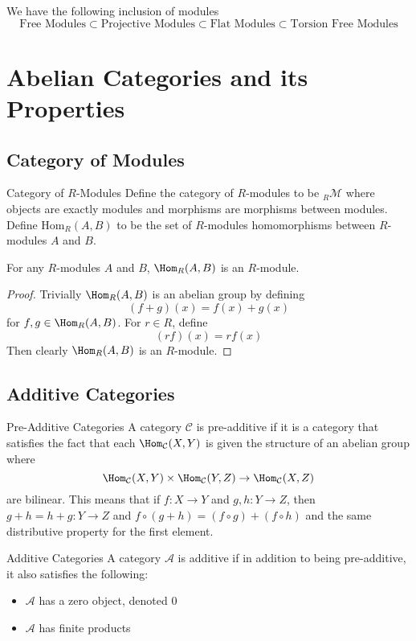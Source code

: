 \documentclass[a4paper]{article}
\begin{document}
We have the following inclusion of modules $$\text{Free Modules}\subset\text{Projective Modules}\subset\text{Flat Modules}\subset\text{Torsion Free Modules}$$

\pagebreak
\section{Abelian Categories and its Properties}
\subsection{Category of Modules}
\begin{defn}{Category of $R$-Modules}{} Define the category of $R$-modules to be $_R\mathcal{M}$ where objects are exactly modules and morphisms are morphisms between modules. Define $\text{Hom}_R(A,B)$ to be the set of $R$-modules homomorphisms between $R$-modules $A$ and $B$. 
\end{defn}

\begin{prp}{}{} For any $R$-modules $A$ and $B$, $\Hom_R(A,B)$ is an $R$-module. \tcbline
\begin{proof}
Trivially $\Hom_R(A,B)$ is an abelian group by defining $$(f+g)(x)=f(x)+g(x)$$ for $f,g\in\Hom_R(A,B)$. For $r\in R$, define $$(rf)(x)=rf(x)$$ Then clearly $\Hom_R(A,B)$ is an $R$-module. 
\end{proof}
\end{prp}

\subsection{Additive Categories}
\begin{defn}{Pre-Additive Categories}{} A category $\mathcal{C}$ is pre-additive if it is a category that satisfies the fact that each $\Hom_\mathcal{C}(X,Y)$ is given the structure of an abelian group where $$\Hom_\mathcal{C}(X,Y)\times\Hom_\mathcal{C}(Y,Z)\to\Hom_\mathcal{C}(X,Z)$$ are bilinear. This means that if $f:X\to Y$ and $g,h:Y\to Z$, then $g+h=h+g:Y\to Z$ and $f\circ(g+h)=(f\circ g)+(f\circ h)$ and the same distributive property for the first element. 
\end{defn}

\begin{defn}{Additive Categories}{} A category $\mathcal{A}$ is additive if in addition to being pre-additive, it also satisfies the following: 
\begin{itemize}
\item $\mathcal{A}$ has a zero object, denoted $0$
\item $\mathcal{A}$ has finite products
\end{itemize}
\end{defn}
\end{document}
